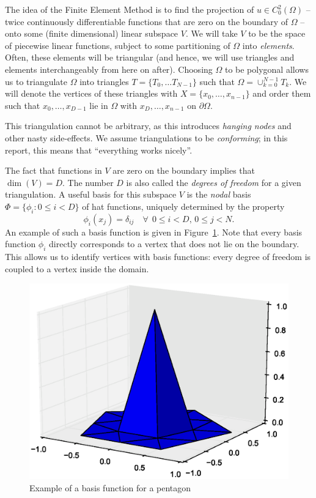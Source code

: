 \documentclass[11pt]{amsart}
\theoremstyle{definition}
\begin{document}
The idea of the Finite Element Method is to find the projection of $u \in C^2_0(\Omega)$ -- twice continuously differentiable functions that are zero on the boundary of $\Omega$ -- onto some (finite dimensional) linear subspace $V$. We will take $V$ to be the space of piecewise linear functions, subject to some partitioning of $\Omega$ into \emph{elements}. Often, these elements will be triangular (and hence, we will use triangles and elements interchangeably from here on after). Choosing $\Omega$ to be polygonal allows us to triangulate $\Omega$ into triangles $T = \{ T_0, \ldots T_{N-1}\}$ such that $\Omega = \cup_{k = 0}^{N-1}T_k$. We will denote the vertices of these triangles with $X = \{x_0, \ldots, x_{n-1}\}$ and order them such that $x_0, \ldots, x_{D-1}$ lie in $\Omega$ with $x_{D}, \ldots, x_{n-1}$ on $\partial \Omega$.

This triangulation cannot be arbitrary, as this introduces \emph{hanging nodes} and other nasty side-effects. We assume triangulations to be \emph{conforming}; in this report, this means that ``everything works nicely''.

The fact that functions in $V$ are zero on the boundary implies that $\dim(V) = D$. The number $D$ is also called the \emph{degrees of freedom} for a given triangulation. A useful basis for this subspace $V$ is the \emph{nodal} basis $\Phi = \{\phi_i: 0 \leq i < D\}$ of hat functions, uniquely determined by the property
\[
  \phi_i( x_j) = \delta_{ij} \quad \forall~~0 \leq i < D,\, 0 \leq j < N.
\] An example of such a basis function is given in Figure~\ref{fig:nodal}. Note that every basis function $\phi_i$ directly corresponds to a vertex that does not lie on the boundary. This allows us to identify vertices with basis functions: every degree of freedom is coupled to a vertex inside the domain.
\begin{figure}
	\centering
	\includegraphics[width=0.5\linewidth]{nodal_vijfhoek.eps}
\caption{Example of a basis function for a pentagon}
\label{fig:nodal}
\end{figure}
\end{document}
